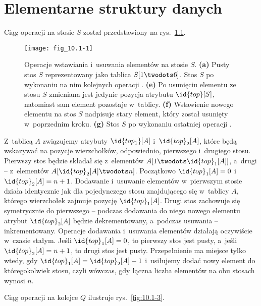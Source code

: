 \chapter{Elementarne struktury danych}


\exercise %
Ciąg operacji na stosie $S$ został przedstawiony na rys.~\ref{fig:10.1-1}.
\begin{figure}[ht]
    \begin{center}
		\texttt{[image: fig\_10.1-1]}
	\end{center}
	\caption{Operacje wstawiania i~usuwania elementów na stosie $S$. {\sffamily\bfseries(a)} Pusty stos $S$ reprezentowany jako tablica $S[1\twodots6]$. {\sffamily\bfseries{}} Stos $S$ po wykonaniu na nim kolejnych operacji . {\sffamily\bfseries(e)} Po usunięciu elementu ze stosu $S$ zmieniana jest jedynie pozycja atrybutu $\id{top}[S]$, natomiast sam element pozostaje w~tablicy. {\sffamily\bfseries(f)} Wstawienie nowego elementu na stos $S$ nadpisuje stary element, który został usunięty w~poprzednim kroku. {\sffamily\bfseries(g)} Stos $S$ po wykonaniu ostatniej operacji .} \label{fig:10.1-1}
\end{figure}

\exercise %
Z~tablicą $A$ związujemy atrybuty $\id{top_1}[A]$ i~$\id{top}_2[A]$, które będą wskazywać na pozycje wierzchołków, odpowiednio, pierwszego i~drugiego stosu. Pierwszy stos będzie składał się z~elementów $A[1\twodots\id{top}_1[A]]$, a~drugi -- z~elementów $A[\id{top}_2[A]\twodots n]$. Początkowo $\id{top}_1[A]=0$ i~$\id{top}_2[A]=n+1$. Dodawanie i~usuwanie elementów w~pierwszym stosie działa identycznie jak dla pojedynczego stosu znajdującego się w~tablicy $A$, którego wierzchołek zajmuje pozycję $\id{top}_1[A]$. Drugi stos zachowuje się symetrycznie do pierwszego -- podczas dodawania do niego nowego elementu atrybut $\id{top}_2[A]$ będzie dekrementowany, a~podczas usuwania -- inkrementowany. Operacje dodawania i~usuwania elementów działają oczywiście w~czasie stałym. Jeśli $\id{top}_1[A]=0$, to pierwszy stos jest pusty, a~jeśli $\id{top}_2[A]=n+1$, to drugi stos jest pusty. Przepełnienie ma miejsce tylko wtedy, gdy $\id{top}_1[A]=\id{top}_2[A]-1$ i~usiłujemy dodać nowy element do któregokolwiek stosu, czyli wówczas, gdy łączna liczba elementów na obu stosach wynosi $n$.

\exercise %
Ciąg operacji na kolejce $Q$ ilustruje rys.~\ref{fig:10.1-3}.

